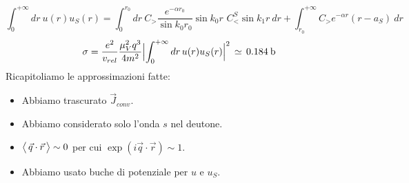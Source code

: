$$\int_0^{+\infty} dr \: u(r)u_S(r) = \int_0^{r_0} dr\: C_> \frac{e^{-\alpha r_0}}{\sin{k_0r_0}}\sin{k_0r}\,\, C_<^S \sin{k_1r}\:dr + \int_{r_0}^{+\infty} C_> e^{-\alpha r}(r-a_S) \: dr$$
$$\sigma = \frac{e^2}{v_{rel}}\frac{\mu^2_V q^3}{4m^2} \Bigl |\int_0^{+\infty} dr \, u(r) u_S(r)\Bigr |^2 \,\simeq\, 0.184\:\mbox{b}$$
Ricapitoliamo le approssimazioni fatte:
\begin{itemize}
    \item Abbiamo trascurato $\vec{J}_{conv}$.
    \item Abbiamo considerato solo l'onda $s$ nel deutone.
    \item $\bigl\langle\, \vec{q}\cdot\vec{r}\, \bigr\rangle\sim 0$ per cui $\exp{(i\vec{q}\cdot\vec{r})}\sim 1$.
    \item Abbiamo usato buche di potenziale per $u$ e $u_S$.
\end{itemize}
